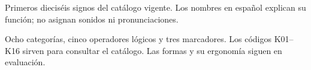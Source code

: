Primeros dieciséis signos del catálogo vigente. Los nombres en español explican
su función; no asignan sonidos ni pronunciaciones.\par
\vspace{2mm}
\noindent {}\hfill{}\hfill{}\hfill{}
\par\vspace{3mm}
\noindent {}\hfill{}\hfill{}\hfill{}
\par\vspace{3mm}
\noindent {}\hfill{}\hfill{}\hfill{}
\par\vspace{3mm}
\noindent {}\hfill{}\hfill{}\hfill{}
\par\vspace{3mm}
{\small\color{KalaSuave}Ocho categorías, cinco operadores lógicos y tres
marcadores. Los códigos K01--K16 sirven para consultar el catálogo.
Las formas y su ergonomía siguen en evaluación.}
